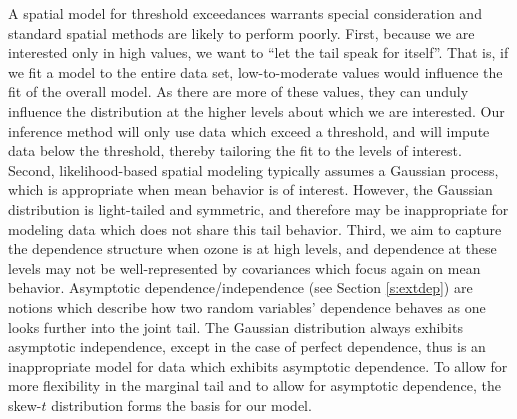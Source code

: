 \documentclass[11pt]{article}
\begin{document}
A spatial model for threshold exceedances warrants special consideration and standard spatial methods are likely to perform poorly.
First, because we are interested only in high values, we want to ``let the tail speak for itself''.
That is, if we fit a model to the entire data set, low-to-moderate values would influence the fit of the overall model.
As there are more of these values, they can unduly influence the distribution at the higher levels about which we are interested.
Our inference method will only use data which exceed a threshold, and will impute data below the threshold, thereby tailoring the fit to the levels of interest.
Second, likelihood-based spatial modeling typically assumes a Gaussian process, which is appropriate when mean behavior is of interest.
However, the Gaussian distribution is light-tailed and symmetric, and therefore may be inappropriate for modeling data which does not share this tail behavior.
Third, we aim to capture the dependence structure when ozone is at high levels, and dependence at these levels may not be well-represented by covariances which focus again on mean behavior.
Asymptotic dependence/independence (see Section \ref{s:extdep}) are notions which describe how two random variables' dependence behaves as one looks further into the joint tail.
The Gaussian distribution always exhibits asymptotic independence, except in the case of perfect dependence, thus is an inappropriate model for data which exhibits asymptotic dependence.
To allow for more flexibility in the marginal tail and to allow for asymptotic dependence, the skew-$t$ distribution forms the basis for our model.
\end{document}

